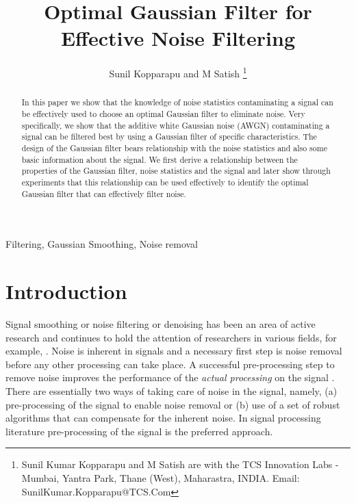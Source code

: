 \documentclass[journal,onecolumn]{IEEEtran}
\title{Optimal Gaussian Filter for Effective Noise Filtering}
\author{Sunil Kopparapu and M Satish
\thanks{Sunil Kumar Kopparapu and M Satish are with the TCS Innovation Labs - Mumbai, Yantra Park, Thane (West), Maharastra, INDIA.
Email: SunilKumar.Kopparapu@TCS.Com}}
\begin{document}
\maketitle

\doublespace
\begin{abstract}

In this paper we show that the knowledge of noise statistics 
contaminating a signal can be effectively used to choose an optimal
 Gaussian filter to 
eliminate noise. Very specifically, we show that the additive white 
Gaussian noise (AWGN) contaminating a signal can be filtered best by 
using a Gaussian filter of specific characteristics. The design of the 
Gaussian filter bears relationship with the noise 
statistics and also some basic information about the signal. We first 
derive a relationship between the properties of the Gaussian filter, 
noise statistics and the signal and later show through experiments that 
this relationship can be used effectively to identify the optimal 
Gaussian filter that can effectively filter noise.
\end{abstract}

\begin{IEEEkeywords}
Filtering, Gaussian Smoothing, Noise removal
\end{IEEEkeywords}


\section{Introduction}

Signal smoothing or noise filtering or denoising 
has been an area of active research and continues to hold 
the attention of researchers in various fields, for example,
\cite{Crisan_Kouritzin_Xiong_2008,Oktem_Egiazarian_Lukin_Ponomarenko_Tsymbal_2007,Buades_Silva_Santos_2010,Huang_Wang_Long_2009,Yang_Wei_2010}.
Noise is inherent in signals 
\cite{Bruni_Piccoli_Vitulano_2008,Narayana:2009:ENM:1946497.1946503}
and a necessary first step is noise removal before any other processing can
take place. A successful pre-processing step to remove noise improves the
performance of the {\em actual processing} on the signal \cite{lajish_2010}.
There are essentially two ways of taking
care of noise in the signal, namely, (a) pre-processing of the signal to
enable noise removal or (b) use of a set of robust algorithms that can
compensate for the inherent noise. In signal processing 
literature pre-processing of the signal is
the preferred approach.
\end{document}
